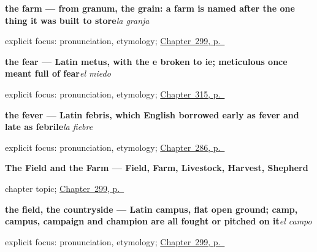 \noindent\begin{minipage}[t]{\linewidth}
\raggedright
\textbf{the farm — from granum, the grain: a farm is named after the one thing it was built to store}\enspace\emph{la granja}\par
\footnotesize explicit focus: pronunciation, etymology; \hyperref[ch:la-granja]{Chapter~299, p.~\pageref*{ch:la-granja}}
\end{minipage}\par\smallskip

\noindent\begin{minipage}[t]{\linewidth}
\raggedright
\textbf{the fear — Latin metus, with the e broken to ie; meticulous once meant full of fear}\enspace\emph{el miedo}\par
\footnotesize explicit focus: pronunciation, etymology; \hyperref[ch:fuerza-y-risa]{Chapter~315, p.~\pageref*{ch:fuerza-y-risa}}
\end{minipage}\par\smallskip

\noindent\begin{minipage}[t]{\linewidth}
\raggedright
\textbf{the fever — Latin febris, which English borrowed early as fever and late as febrile}\enspace\emph{la fiebre}\par
\footnotesize explicit focus: pronunciation, etymology; \hyperref[ch:donde-duele]{Chapter~286, p.~\pageref*{ch:donde-duele}}
\end{minipage}\par\smallskip

\noindent\begin{minipage}[t]{\linewidth}
\raggedright
\textbf{The Field and the Farm --- Field, Farm, Livestock, Harvest, Shepherd}\par
\footnotesize chapter topic; \hyperref[ch:la-granja]{Chapter~299, p.~\pageref*{ch:la-granja}}
\end{minipage}\par\smallskip

\noindent\begin{minipage}[t]{\linewidth}
\raggedright
\textbf{the field, the countryside — Latin campus, flat open ground; camp, campus, campaign and champion are all fought or pitched on it}\enspace\emph{el campo}\par
\footnotesize explicit focus: pronunciation, etymology; \hyperref[ch:la-granja]{Chapter~299, p.~\pageref*{ch:la-granja}}
\end{minipage}\par\smallskip

